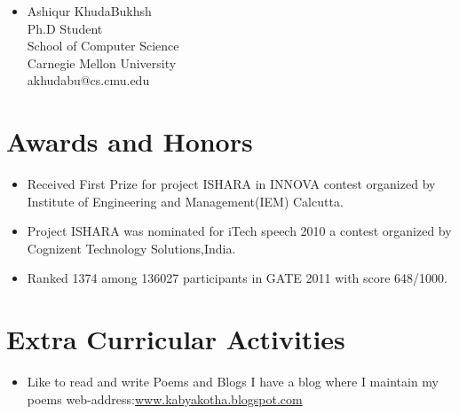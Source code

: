 \documentclass{res}
\begin{document}
\begin{resume}
\begin{itemize}
\item Ashiqur KhudaBukhsh \\
Ph.D Student \\
School of Computer Science \\
Carnegie Mellon University \\
akhudabu@cs.cmu.edu \\

\end{itemize}
 
\section{Awards and Honors}
   \begin{itemize}
   \item Received {\color{blue} First Prize} for project ISHARA in INNOVA contest organized by Institute of Engineering and Management(IEM) Calcutta.

   \item Project ISHARA was nominated for iTech speech 2010 a contest organized by Cognizent Technology Solutions,India.

   \item Ranked 1374 among 136027 participants in GATE 2011 with score 648/1000.   

   \end{itemize}

\section{Extra Curricular Activities} 

\begin{itemize}
         
\item    Like to read and write Poems and Blogs 
    I have a blog where I maintain my poems 
    web-address:{\color{blue}\url {www.kabyakotha.blogspot.com} } 
\end{itemize} 
 
\end{resume}
\end{document}
